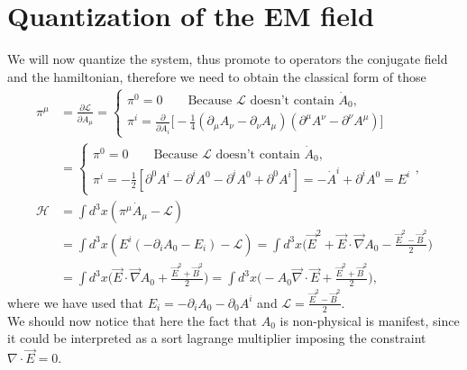 \section{Quantization of the EM field} 
We will now quantize the system, thus promote to operators the conjugate field and the hamiltonian, therefore we need to obtain the classical form of those
\begin{align*}
    \pi^\mu&=\frac{\partial\mathcal{L} }{\partial\dot{A}_\mu}=\begin{cases}
        \pi^0=0 \qquad\text{Because $\mathcal{L} $ doesn't contain $\dot{A}_0$,}\\
        \pi^i=\frac{\partial }{\partial\dot{A}_i}\bigg[-\frac{1}{4}(\partial_\mu A_\nu-\partial_\nu A_\mu)(\partial^\mu A^\nu-\partial^\nu A^\mu)\bigg]
    \end{cases}\\&=\begin{cases}
        \pi^0=0 \qquad\text{Because $\mathcal{L} $ doesn't contain $\dot{A}_0$,}\\
        \pi^i=-\frac{1}{2}[\partial^0 A^i-\partial^i A^0-\partial^i A^0+\partial^0 A^i]=-\dot{A}^i+\partial^iA^0=E^i
    \end{cases},\\
    \mathcal{H} &=\int d^3x(\pi^\mu \dot{A}_\mu-\mathcal{L} )\\
    &=\int d^3x(E^i (-\partial_iA_0-E_i)-\mathcal{L} )=\int d^3x\bigg(\vec E^2+\vec E\cdot\vec\nabla A_0-\frac{\vec E^2-\vec B^2}{2}\bigg)\\&=\int d^3x\bigg(\vec E\cdot\vec\nabla A_0+\frac{\vec E^2+\vec B^2}{2}\bigg)=\int d^3x\bigg(-A_0\vec \nabla\cdot\vec E +\frac{\vec E^2+\vec B^2}{2}\bigg),
\end{align*}
where we have used that $E_i=-\partial_i A_0-\partial_0A^i$ and $\mathcal{L} =\frac{\vec E^2-\vec B^2}{2}$.\\We should now notice that here the fact that $A_0$ is non-physical is manifest, since it could be interpreted as a sort lagrange multiplier imposing the constraint $\nabla\cdot\vec E=0$.\\

